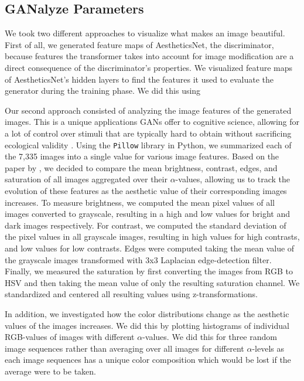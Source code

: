 \documentclass[../main.tex]{subfiles}
\begin{document}
	
	
\subsection{GANalyze Parameters}
We took two different approaches to visualize what makes an image beautiful. First of all, we generated feature maps of AestheticsNet, the discriminator, because features the transformer takes into account for image modification are a direct consequence of the discriminator's properties. We visualized feature maps of AestheticsNet's hidden layers to find the features it used to evaluate the generator during the training phase. We did this using 
	
Our second approach consisted of analyzing the image features of the generated images. This is a unique applications GANs offer to cognitive science, allowing for a lot of control over stimuli that are typically hard to obtain without sacrificing ecological validity \parencite{goetschalckx2021generative}. Using the \texttt{Pillow} library \parencite{clark2015pillow} in Python, we summarized each of the 7,335 images into a single value for various image features. Based on the paper by \textcite{ke2006design}, we decided to compare the mean brightness, contrast, edges, and saturation of all images aggregated over their $\alpha$-values, allowing us to track the evolution of these features as the aesthetic value of their corresponding images increases. To measure brightness, we computed the mean pixel values of all images converted to grayscale, resulting in a high and low values for bright and dark images respectively. For contrast, we computed the standard deviation of the pixel values in all grayscale images, resulting in high values for high contrasts, and low values for low contrasts. Edges were computed taking the mean value of the grayscale images transformed with 3x3 Laplacian edge-detection filter. Finally, we measured the saturation by first converting the images from RGB to HSV and then taking the mean value of only the resulting saturation channel. We standardized and centered all resulting values using z-transformations.
	
In addition, we investigated how the color distributions change as the aesthetic values of the images increases. We did this by plotting histograms of individual RGB-values of images with different $\alpha$-values. We did this for three random image sequences rather than averaging over all images for different $\alpha$-levels as each image sequences has a unique color composition which would be lost if the average were to be taken.
\end{document}
